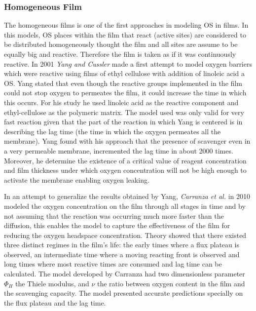 \begin{refsection}
\subsubsection{Homogeneous Film}

The homogeneous films is one of the first approaches in modeling OS in films. In this models,  OS places within the film that react (active sites) are considered to be distributed homogeneously thought the film and all sites are assume to be equally big and reactive. Therefore the film is taken as if it was continuously reactive. In 2001 \textit{Yang and Cussler} \cite{Yang2001OxygenChemistry}  made a first attempt to model oxygen barriers which were reactive using films of ethyl cellulose with addition of linoleic acid a OS. Yang stated that even though the reactive groups implemented in the film could not stop oxygen to permeates the film, it could increase the time in which this occurs. For his study he used linoleic acid as the reactive component and ethyl-cellulose as the polymeric matrix. The model  used  was only valid for very fast reaction given that the part of the reaction in which Yang is centered is in describing the lag time (the time in which the oxygen permeates all the membrane). Yang found with his approach that the presence of scavenger even in a very permeable membrane, incremented the lag time in about 2000 times. Moreover, he determine the existence of a critical value of reagent concentration and film thickness under which oxygen concentration will not be high enough to activate the membrane enabling oxygen leaking.

In an attempt to generalize the results obtained by Yang, \textit{Carranza et al.} \cite{carranza2010modeling}  in 2010 modeled the oxygen concentration on the film through all stages in time and by not assuming that the reaction was  occurring much more faster than the diffusion, this enables the model to capture the effectiveness of the film  for reducing the oxygen headspace concentration. Theory showed that there existed three distinct regimes in the film's life: the early times where a flux plateau is observed, an intermediate time where a moving reacting front is observed and long times where most reactive times are consumed and lag time can be calculated. The model developed by Carranza had two dimensionless parameter $\Phi_H$ the Thiele modulus, and $\nu$ the ratio between oxygen content in the film and the scavenging capacity. The model presented accurate predictions specially on the flux plateau and the lag time.


\end{refsection}
